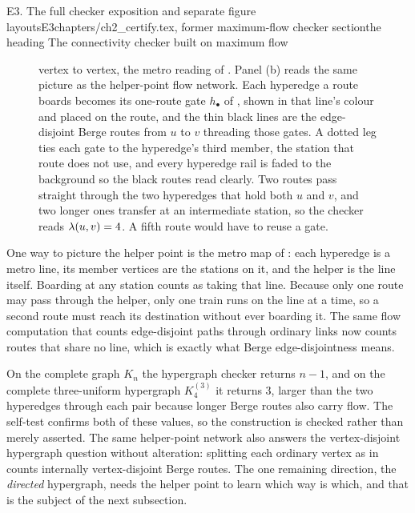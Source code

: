 \begin{offcut}{E3. The full checker exposition and separate figure layouts}{E3}{chapters/ch2\_certify.tex, former maximum-flow checker section}{the heading The connectivity checker built on maximum flow}
\begin{figure}[htbp]
{vertex to vertex, the metro reading of . Panel (b) reads the
same picture as the helper-point flow network. Each hyperedge a route boards
becomes its one-route gate $h_{\bullet}$ of , shown in that
line's colour and placed on the route, and the thin black lines are the
edge-disjoint Berge routes from $u$ to $v$ threading those gates. A dotted leg ties
each gate to the hyperedge's third member, the station that route does not use, and
every hyperedge rail is faded to the background so the black routes read clearly. Two routes pass straight through the two hyperedges that
hold both $u$ and $v$, and two longer ones transfer at an intermediate station, so
the checker reads $\lambda(u, v) = 4$. A fifth route would have to reuse a gate.}
\end{figure}
One way to picture the helper point is the metro map of : each hyperedge is a metro line, its member vertices are the stations on it, and the helper is the line itself. Boarding at any station counts as taking that line. Because only one route may pass through the helper, only one train runs on the line at a time, so a second route must reach its destination without ever boarding it. The same flow computation that counts edge-disjoint paths through ordinary links now counts routes that share no line, which is exactly what Berge edge-disjointness means.

On the complete graph $K_n$ the hypergraph checker returns $n - 1$, and on the complete three-uniform hypergraph $K_4^{(3)}$ it returns $3$, larger than the two hyperedges through each pair because longer Berge routes also carry flow. The self-test confirms both of these values, so the construction is checked rather than merely asserted. The same helper-point network also answers the vertex-disjoint hypergraph question without alteration: splitting each ordinary vertex as in  counts internally vertex-disjoint Berge routes. The one remaining direction, the \emph{directed} hypergraph, needs the helper point to learn which way is which, and that is the subject of the next subsection.


\end{offcut}
